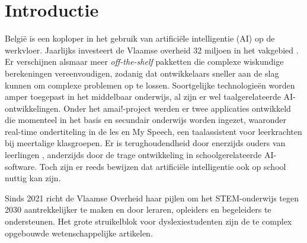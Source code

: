 
\section{Introductie}%
\label{sec:introductie}


België is een koploper in het gebruik van artificiële intelligentie (AI) op de werkvloer. Jaarlijks investeert de Vlaamse overheid 32 miljoen in het vakgebied \autocite{Crevits2022}. Er verschijnen alsmaar meer \textit{off-the-shelf} pakketten die complexe wiskundige berekeningen vereenvoudigen, zodanig dat ontwikkelaars sneller aan de slag kunnen om complexe problemen op te lossen.  Soortgelijke technologieën worden amper toegepast in het middelbaar onderwijs, al zijn er wel taalgerelateerde AI-ontwikkelingen. Onder het amai!-project werden er twee applicaties ontwikkeld die momenteel in het basis en secundair onderwijs worden ingezet, waaronder real-time ondertiteling in de les en My Speech, een taalassistent voor leerkrachten bij meertalige klasgroepen.  Er is terughoudendheid door enerzijds ouders van leerlingen \autocite{Martens2021}, anderzijds door de trage ontwikkeling in schoolgerelateerde AI-software. Toch zijn er reeds bewijzen dat artificiële intelligentie ook op school nuttig kan zijn. 

Sinds 2021 richt de Vlaamse Overheid haar pijlen om het STEM-onderwijs tegen 2030 aantrekkelijker te maken en door leraren, opleiders en begeleiders te ondersteunen. Het grote struikelblok voor dyslexiestudenten zijn de te complex opgebouwde wetenschappelijke artikelen.







